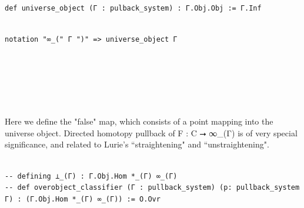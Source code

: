 \documentclass{book}
\theoremstyle{definition}
\newcounter{pcounter}
\newcounter{lcounter}
\newcounter{sectioncount}
\newcounter{subsectioncount}
\renewcommand{\section}[1]{\newpage\ \\ \ \\ \begin{center} \scalebox{1.5}{\texttt{\thesectioncount . #1}} \stepcounter{sectioncount} \setcounter{subsectioncount}{1} \end{center} \begin{center} \ \\ \ \\ \thispagestyle{empty} \end{center}}
\begin{document}
{{\begin{center}
\begin{tcolorbox}[width=5in,colback={white},title={\begin{center}\texttt{Lean \thelcounter} \addtocounter{lcounter}{1}  \end{center}},colbacktitle=Blue,coltitle=black]
\begin{verbatim}
def universe_object (Γ : pulback_system) : Γ.Obj.Obj := Γ.Inf

\end{verbatim}
\end{tcolorbox}
\end{center}

\begin{center}
\begin{tcolorbox}[width=5in,colback={white},title={\begin{center}\texttt{Lean \thelcounter} \addtocounter{lcounter}{1}  \end{center}},colbacktitle=Blue,coltitle=black]
\begin{verbatim}

notation "∞_(" Γ ")" => universe_object Γ

\end{verbatim}
\end{tcolorbox}
\end{center}

\section{$\texttt{⊥\_(Γ)}$}

Here we define the "false" map, which consists of a point mapping into the universe object. Directed homotopy pullback of F : C ⭢ ∞\_(Γ) is of very special significance, and related to Lurie's ``straightening" and ``unstraightening".\\

\begin{center}
\begin{tcolorbox}[width=5in,colback={white},title={\begin{center}\texttt{Lean \thelcounter} \addtocounter{lcounter}{1}  \end{center}},colbacktitle=Blue,coltitle=black]
\begin{verbatim}

-- defining ⊥_(Γ) : Γ.Obj.Hom *_(Γ) ∞_(Γ)
-- def overobject_classifier (Γ : pullback_system) (p: pullback_system Γ) : (Γ.Obj.Hom *_(Γ) ∞_(Γ)) := O.Ovr

\end{verbatim}
\end{tcolorbox}
\end{center}

\begin{center}
\begin{tcolorbox}[width=5in,colback={white},title={\begin{center}\texttt{Lean \thelcounter} \addtocounter{lcounter}{1}  \end{center}},colbacktitle=Blue,coltitle=black]
\begin{verbatim}


\end{verbatim}
\end{tcolorbox}
\end{center}}}
\end{document}
